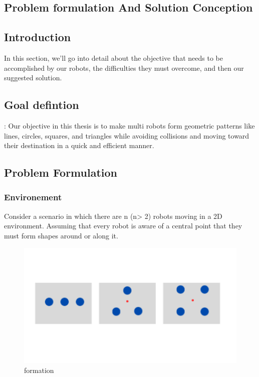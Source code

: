 \documentclass[12pt]{article}
\begin{document}
  
  
\newpage
\pagebreak
\hspace{0pt}
\vfill
\begin{center}
\section{Problem formulation And Solution Conception }
\end{center}
\vfill
\hspace{0pt}

\pagebreak

 

\subsection{Introduction}
 In this section, we'll go into  detail about the objective that needs to be accomplished by our robots, the difficulties they must overcome, and then our suggested solution.
 
\subsection{Goal defintion}:
Our objective in this thesis is to make multi robots  form geometric patterns like lines, circles, squares, and triangles while avoiding collisions and moving toward their destination in a quick and efficient manner. 



\subsection{Problem Formulation}
 

\subsubsection{Environement}
Consider a scenario in which there are n (n> 2) robots moving in a 2D environment. Assuming that every robot is aware of a central point that they must form shapes around or along it.


 
 \begin{figure}[h]  
\centering
\includegraphics[scale=0.4]{formation}
\caption[formation]{formation}
\end{figure}
\end{document}

